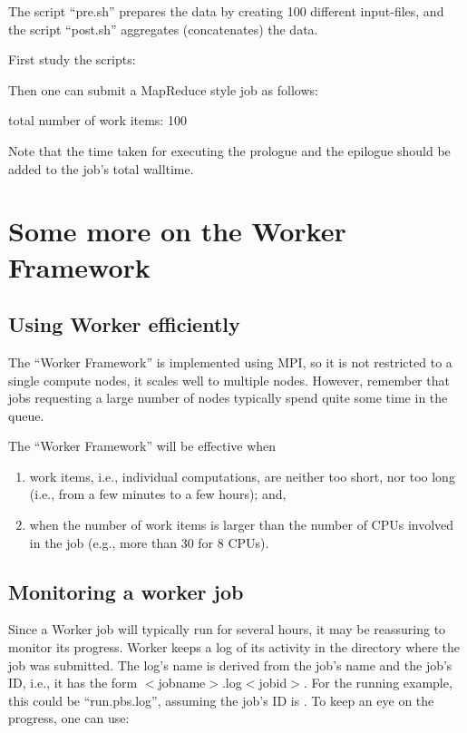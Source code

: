 The script ``pre.sh'' prepares the data by creating 100 different input-files,
and the script ``post.sh'' aggregates (concatenates) the data.


First study the scripts:


Then one can submit a MapReduce style job as follows:

\begin{prompt}
total number of work items: 100
\end{prompt}

Note that the time taken for executing the prologue and the epilogue should be
added to the job's total walltime.

\section{Some more on the Worker Framework}

\subsection{Using Worker efficiently}

The ``Worker Framework'' is implemented using MPI, so it is not restricted to a
single compute nodes, it scales well to multiple nodes. However, remember that
jobs requesting a large number of nodes typically spend quite some time in the
queue.

The ``Worker Framework'' will be effective when

\begin{enumerate}
\item  work items, i.e., individual computations, are neither too short, nor too long (i.e., from a few minutes to a few hours); and,
\item  when the number of work items is larger than the number of CPUs involved in the job (e.g., more than 30 for 8 CPUs).
\end{enumerate}

\subsection{Monitoring a worker job}

Since a Worker job will typically run for several hours, it may be reassuring
to monitor its progress. Worker keeps a log of its activity in the directory
where the job was submitted. The log's name is derived from the job's name and
the job's ID, i.e., it has the form $<$jobname$>$.log$<$jobid$>$. For the
running example, this could be ``run.pbs.log\jobnumber'', assuming the job's ID is
\jobnumber. To keep an eye on the progress, one can use:

